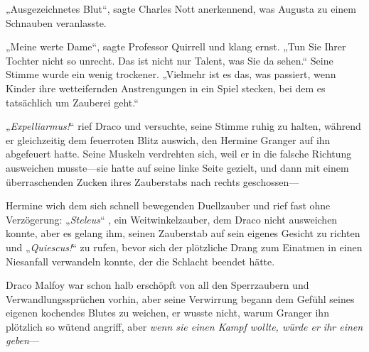 „Ausgezeichnetes Blut“, sagte Charles Nott anerkennend, was Augusta zu einem Schnauben veranlasste.

„Meine werte Dame“, sagte Professor Quirrell und klang ernst. „Tun Sie Ihrer Tochter nicht so unrecht. Das ist nicht nur Talent, was Sie da sehen.“ Seine Stimme wurde ein wenig trockener. „Vielmehr ist es das, was passiert, wenn Kinder ihre wetteifernden Anstrengungen in ein Spiel stecken, bei dem es tatsächlich um Zauberei geht.“

\later

„\emph{Expelliarmus!}“ rief Draco und versuchte, seine Stimme ruhig zu halten, während er gleichzeitig dem feuerroten Blitz auswich, den Hermine Granger auf ihn abgefeuert hatte. Seine Muskeln verdrehten sich, weil er in die falsche Richtung ausweichen musste—sie hatte auf seine linke Seite gezielt, und dann mit einem überraschenden Zucken ihres Zauberstabs nach rechts geschossen—

Hermine wich dem sich schnell bewegenden Duellzauber und rief fast ohne Verzögerung: „\emph{Steleus}“ , ein Weitwinkelzauber, dem Draco nicht ausweichen konnte, aber es gelang ihm, seinen Zauberstab auf sein eigenes Gesicht zu richten und „\emph{Quiescus!}“ zu rufen, bevor sich der plötzliche Drang zum Einatmen in einen Niesanfall verwandeln konnte, der die Schlacht beendet hätte.

Draco Malfoy war schon halb erschöpft von all den Sperrzaubern und Verwandlungssprüchen vorhin, aber seine Verwirrung begann dem Gefühl seines eigenen kochendes Blutes zu weichen, er wusste nicht, warum Granger ihn plötzlich so wütend angriff, aber \emph{wenn sie einen Kampf wollte, würde er ihr einen geben}—


